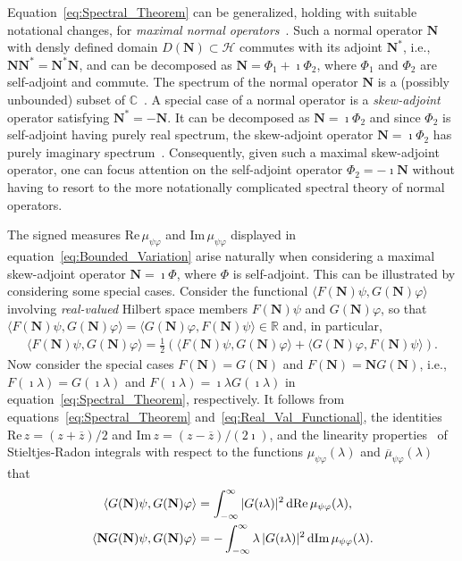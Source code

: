 \documentclass[leqno,onefignum,onetabnum]{siamltex1213}
\renewcommand{\d}{\mathrm{d}}
\newcommand\Real{\mbox{Re}\,} %
\newcommand\Imag{\mbox{Im}\,} %
\newcommand{\Nb}{\mathbf{N}}
\newcommand{\Hs}{\mathscr{H}}
\begin{document}
Equation~\eqref{eq:Spectral_Theorem} can be generalized, holding with
suitable notational changes, for \emph{maximal normal
  operators}~\cite{Stone:64}. Such a normal operator $\Nb$ with densly
defined domain $D(\Nb)\subset\Hs$ commutes with its adjoint $\Nb^*$, i.e.,
$\Nb\Nb^*=\Nb^*\Nb$, and can be decomposed as $\Nb=\Phi_1+\imath\Phi_2$, where
$\Phi_1$ and $\Phi_2$ are self-adjoint and commute. The spectrum of the
normal operator $\Nb$ is 
a (possibly unbounded) subset of $\mathbb{C}$~\cite{Stone:64}. A
special case of a normal operator is a \emph{skew-adjoint} operator
satisfying $\Nb^*=-\Nb$. It can be decomposed as $\Nb=\imath\Phi_2$ and since
$\Phi_2$ is self-adjoint having purely real spectrum, the skew-adjoint
operator $\Nb=\imath\Phi_2$ has purely imaginary
spectrum~\cite{Stone:64}. Consequently, given such a maximal
skew-adjoint operator, one can focus attention on the self-adjoint
operator $\Phi_2=-\imath\Nb$ without having to resort to the more notationally
complicated spectral theory of normal operators.





The signed measures $\Real\mu_{\psi\varphi}$ and $\Imag\mu_{\psi\varphi}$ displayed in
equation~\eqref{eq:Bounded_Variation} arise naturally when considering
a maximal skew-adjoint operator $\Nb=\imath\Phi$, where $\Phi$ is
self-adjoint. This can be illustrated by considering some special
cases. Consider the functional $\langle F(\Nb)\psi,G(\Nb)\varphi\rangle$ involving
\emph{real-valued} Hilbert space members $F(\Nb)\psi$ and $G(\Nb)\varphi$, so
that $\langle F(\Nb)\psi,G(\Nb)\varphi\rangle=\langle G(\Nb)\varphi,F(\Nb)\psi\rangle\in\mathbb{R}$ and, in
particular, 
%
\begin{align}\label{eq:Real_Val_Functional}
  \langle F(\Nb)\psi,G(\Nb)\varphi\rangle=\frac{1}{2}(\langle F(\Nb)\psi,G(\Nb)\varphi\rangle+\langle G(\Nb)\varphi,F(\Nb)\psi\rangle).
\end{align}
%
Now consider the special cases $F(\Nb)=G(\Nb)$ and $F(\Nb)=\Nb G(\Nb)$,
i.e., $F(\imath\lambda)=G(\imath\lambda)$ and $F(\imath\lambda)=\imath\lambda G(\imath\lambda)$ in
equation~\eqref{eq:Spectral_Theorem}, respectively. It follows 
from equations~\eqref{eq:Spectral_Theorem}
and~\eqref{eq:Real_Val_Functional}, the identities
$\Real z=(z+\overline{z})/2$ and $\Imag z=(z-\overline{z})/(2\imath)$, and
the linearity properties~\cite{Stone:64} of Stieltjes-Radon integrals
with respect to the functions $\mu_{\psi\varphi}(\lambda)$ and $\overline{\mu}_{\psi\varphi}(\lambda)$ that
%
\begin{align}\label{eq:Real_Imag_mu_Reps}
  \langle G(\Nb)\psi,G(\Nb)\varphi\rangle&=\int_{-\infty}^\infty|G(\imath\lambda)|^2\,\d\Real\mu_{\psi\varphi}(\lambda),
  \\
   \langle\Nb G(\Nb)\psi,G(\Nb)\varphi\rangle&=-\int_{-\infty}^\infty\lambda\,|G(\imath\lambda)|^2\,\d\Imag\mu_{\psi\varphi}(\lambda).
   \notag
\end{align}
%
\end{document}
